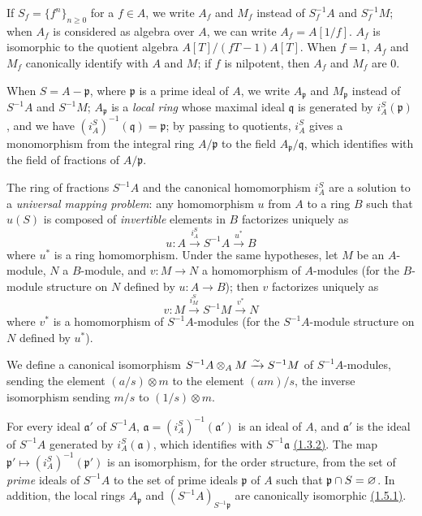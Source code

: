\begin{env}[1.2.3]
\label{0.1.2.3}
If $S_f=\{f^n\}_{n\geqslant 0}$ for a $f\in A$, we write $A_f$ and $M_f$ instead
of $S_f^{-1}A$ and $S_f^{-1}M$; when $A_f$ is considered as algebra over $A$, we
can write $A_f=A[1/f]$. $A_f$ is isomorphic to the quotient algebra
$A[T]/(fT-1)A[T]$. When $f=1$, $A_f$ and $M_f$ canonically identify with $A$ and
$M$; if $f$ is nilpotent, then $A_f$ and $M_f$ are $0$.

When $S=A-\mathfrak{p}$, where $\mathfrak{p}$ is a prime ideal of $A$, we write
$A_\mathfrak{p}$ and $M_\mathfrak{p}$ instead of $S^{-1}A$ and $S^{-1}M$;
$A_\mathfrak{p}$ is a {\em local ring} whose maximal ideal $\mathfrak{q}$ is
generated by $i_A^S(\mathfrak{p})$, and we have
$(i_A^S)^{-1}(\mathfrak{q})=\mathfrak{p}$; by passing to quotients, $i_A^S$
gives a monomorphism from the integral ring $A/\mathfrak{p}$ to the field
$A_\mathfrak{p}/\mathfrak{q}$, which identifies with the field of fractions of
$A/\mathfrak{p}$.
\end{env}

\begin{env}[1.2.4]
\label{0.1.2.4}
The ring of fractions $S^{-1}A$ and the canonical homomorphism $i_A^S$ are a
solution to a {\em universal mapping problem}: any homomorphism $u$ from $A$ to
a ring $B$ such that $u(S)$ is composed of {\em invertible} elements in $B$
factorizes uniquely as
\[
  u:A\xrightarrow{i_A^S}S^{-1}A\xrightarrow{u^*}B
\]
where $u^*$ is a ring homomorphism. Under the same hypotheses, let $M$ be an
$A$-module, $N$ a $B$-module, and $v:M\to N$ a homomorphism of $A$-modules (for
the $B$-module structure on $N$ defined by $u:A\to B$); then $v$ factorizes
uniquely as
\[
  v:M\xrightarrow{i_M^S}S^{-1}M\xrightarrow{v^*}N
\]
where $v^*$ is a homomorphism of $S^{-1}A$-modules (for the $S^{-1}A$-module
structure on $N$ defined by $u^*$).
\end{env}

\begin{env}[1.2.5]
\label{0.1.2.5}
We define a canonical isomorphism $S^{-1}A\otimes_A M\xrightarrow{\sim} S^{-1}M$ of
$S^{-1}A$-modules, sending the element $(a/s)\otimes m$ to the element $(am)/s$,
the inverse isomorphism sending $m/s$ to $(1/s)\otimes m$.
\end{env}

\begin{env}[1.2.6]
\label{0.1.2.6}
For every ideal $\mathfrak{a}'$ of $S^{-1}A$,
$\mathfrak{a}=(i_A^S)^{-1}(\mathfrak{a}')$ is an ideal of $A$, and
$\mathfrak{a}'$ is the ideal of $S^{-1}A$ generated by $i_A^S(\mathfrak{a})$,
which identifies with $S^{-1}\mathfrak{a}$ \hyperref[0.1.3.2]{(1.3.2)}. The map
$\mathfrak{p}'\mapsto(i_A^S)^{-1}(\mathfrak{p}')$ is an isomorphism, for the
order structure, from the set of {\em prime} ideals of $S^{-1}A$ to the set of
prime ideals $\mathfrak{p}$ of $A$ such that $\mathfrak{p}\cap S=\varnothing$. In
addition, the local rings $A_\mathfrak{p}$ and $(S^{-1}A)_{S^{-1}\mathfrak{p}}$
are canonically isomorphic \hyperref[0.1.5.1]{(1.5.1)}.
\end{env}


